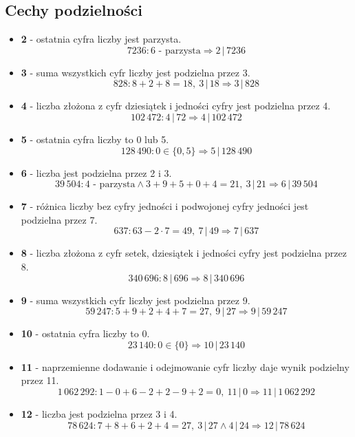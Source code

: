 \documentclass[14pt,a4paper]{extarticle}
\begin{document}
\subsection{Cechy podzielności}
\begin{itemize}
   \item \textbf{2} - ostatnia cyfra liczby jest parzysta.
   \[7236: 6\text{ - parzysta}\Rightarrow 2\,\vert\, 7236\]
   \item \textbf{3} - suma wszystkich cyfr liczby jest podzielna przez 3.
   \[828: 8 + 2 + 8 = 18,\:3\,\vert\,18 \Rightarrow 3\,\vert\,828\]
   \item \textbf{4} - liczba złożona z cyfr dziesiątek i jedności cyfry jest podzielna przez 4.
   \[102\,472: 4\,\vert\,72 \Rightarrow 4\,\vert\, 102\,472\]
   \item \textbf{5} - ostatnia cyfra liczby to 0 lub 5.
   \[128\,490: 0 \in \{0, 5\} \Rightarrow 5\,\vert\,128\,490\]
   \item \textbf{6} - liczba jest podzielna przez 2 i 3.
   \[39\,504: 4\text{ - parzysta} \land 3 + 9 + 5 + 0 + 4 = 21,\:3\,\vert\,21 \Rightarrow 6\,\vert\,39\,504\]
   \item \textbf{7} - różnica liczby bez cyfry jedności i podwojonej cyfry jedności jest podzielna przez 7.
   \[637: 63 - 2 \cdot 7 = 49,\:7\,\vert\,49 \Rightarrow 7\,\vert\, 637\]
   \item \textbf{8} - liczba złożona z cyfr setek, dziesiątek i jedności cyfry jest podzielna przez 8.
   \[340\,696: 8\,\vert\,696 \Rightarrow 8\,\vert\, 340\,696\]
   \item \textbf{9} - suma wszystkich cyfr liczby jest podzielna przez 9.
   \[59\,247: 5+9+2+4+7 = 27,\:9\,\vert\,27 \Rightarrow 9\,\vert\, 59\,247\]
   \item \textbf{10} - ostatnia cyfra liczby to 0.
   \[23\,140: 0 \in \{0\} \Rightarrow 10\,\vert\,23\,140\]
   \item \textbf{11} - naprzemienne dodawanie i odejmowanie cyfr liczby daje wynik podzielny przez 11.
   \[1\,062\,292: 1-0+6-2+2-9+2 = 0,\: 11\,\vert\,0 \Rightarrow 11\,\vert\,1\,062\,292\]
   \item \textbf{12} - liczba jest podzielna przez 3 i 4.
   \[78\,624: 7+8+6+2+4 = 27,\: 3\,\vert\,27 \land 4\,\vert\,24 \Rightarrow 12\,\vert\,78\,624\]
\end{itemize}
\end{document}
